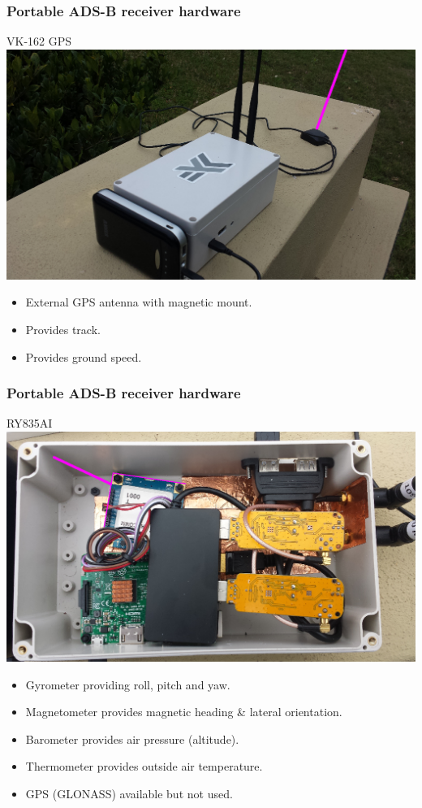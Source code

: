 \begin{frame}
\frametitle{Portable ADS-B receiver hardware}
\begin{block}{VK-162 GPS}
\includegraphics[height=0.5\textheight]{image/adsb-hardware-vk162.png}
\begin{itemize}
\item External GPS antenna with magnetic mount.
\item Provides track.
\item Provides ground speed.
\end{itemize}
\end{block}
\end{frame}

\begin{frame}
\frametitle{Portable ADS-B receiver hardware}
\begin{block}{RY835AI}
\includegraphics[height=0.5\textheight]{image/adsb-hardware-ry835ai.png}
\tiny
\begin{itemize}
\item Gyrometer providing roll, pitch and yaw.
\item Magnetometer provides magnetic heading \& lateral orientation.
\item Barometer provides air pressure (altitude).
\item Thermometer provides outside air temperature.
\item GPS (GLONASS) available but not used.
\end{itemize}
\end{block}
\end{frame}


